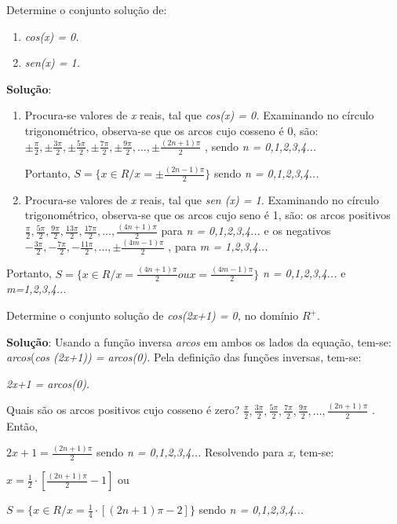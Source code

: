 \begin{texemplo}
Determine o conjunto solução de:

\begin{enumerate}
    \item \textit{cos(x) = 0.}
    \item \textit{sen(x) = 1.}
\end{enumerate}

\textbf{Solução}:

\begin{enumerate}
    \item   Procura-se valores de \textit{x} reais, tal que \textit{cos(x) = 0.} Examinando no círculo trigonométrico, observa-se que os arcos cujo cosseno é 0, são:   \(  \pm \frac{ \pi }{2}, \pm \frac{3 \pi }{2}, \pm \frac{5 \pi }{2}, \pm \frac{7 \pi }{2}, \pm \frac{9 \pi }{2}, \ldots , \pm \frac{ \left( 2n+1 \right)  \pi }{2} \)  , sendo \textit{n = 0,1,2,3,4...}

Portanto,  $S = \{x \in R / x = \pm \frac{(2n-1)\pi}{2}\}$ sendo \textit{n = 0,1,2,3,4...}

    \item  Procura-se valores de \textit{x} reais, tal que \textit{sen (x) = 1.} Examinando no círculo trigonométrico, observa-se que os arcos cujo seno é 1, são:  os arcos positivos  \( \frac{ \pi }{2},\frac{5 \pi }{2},\frac{9 \pi }{2},\frac{13 \pi }{2},\frac{17 \pi }{2}, \ldots ,\frac{ \left( 4n+1 \right)  \pi }{2} \)    para \textit{n = 0,1,2,3,4...} e os negativos  \( -\frac{3 \pi }{2},-\frac{7 \pi }{2},-\frac{11 \pi }{2}, \ldots , \pm \frac{ \left( 4m-1 \right)  \pi }{2} \)  ,  para \textit{m = 1,2,3,4...}
\end{enumerate}

Portanto, $S = \{x \in R / x = \frac{(4n+1)\pi}{2} ou x = \frac{(4m-1)\pi}{2}\}$  \textit{n = 0,1,2,3,4...} e\textit{ m=1,2,3,4...} \textit{\qedsymbol}
\end{texemplo}

\begin{texemplo}
Determine o conjunto solução de \textit{cos(2x+1) = 0, }no domínio\textit{  \( R^{+}. \) }

\textbf{Solução}: Usando a função inversa \textit{arcos} em ambos os lados da equação, tem-se: \textit{arcos}(\textit{cos (2x+1)) = arcos(0). }Pela definição das funções inversas, tem-se:

\textit{2x+1 = arcos(0).}

Quais são os arcos positivos cujo cosseno é zero?    \( \frac{ \pi }{2},\frac{3 \pi }{2},\frac{5 \pi }{2},\frac{7 \pi }{2},\frac{9 \pi }{2}, \ldots ,\frac{ \left( 2n+1 \right)  \pi }{2} \)  . Então,

 \( 2x+1= \frac{ \left( 2n+1 \right)  \pi }{2} \)   sendo \textit{n = 0,1,2,3,4... }Resolvendo para\textit{ x, }tem-se:

 \( x= \frac{1}{2} \cdot  \left[ \frac{ \left( 2n+1 \right)  \pi }{2}-1 \right]  \)   ou

$S = \{x \in R / x = \frac{1}{4} \cdot [(2n+1)\pi-2] \}$ sendo \textit{n = 0,1,2,3,4...} \qedsymbol
\end{texemplo}

